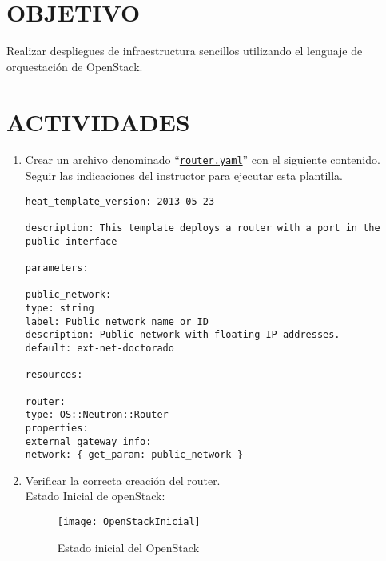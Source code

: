 \documentclass[10pt]{article}   			%
\begin{document}
\section{OBJETIVO}
Realizar despliegues de infraestructura sencillos utilizando el lenguaje de orquestación de OpenStack.
\section{ACTIVIDADES}	

\begin{enumerate}


	\item  Crear un archivo denominado “\texttt{\href{https://github.com/wilrilo/talleres/blob/master/file/taller1/router.yaml}{router.yaml}}” con el siguiente contenido. Seguir las indicaciones del instructor para ejecutar esta plantilla.

\begin{small}
	\begin{lstlisting}[frame=single,style=base]	
heat_template_version: 2013-05-23

description: This template deploys a router with a port in the public interface

parameters:

public_network:
type: string
label: Public network name or ID
description: Public network with floating IP addresses.
default: ext-net-doctorado

resources:

router:
type: OS::Neutron::Router
properties:
external_gateway_info:
network: { get_param: public_network }

	\end{lstlisting}
\end{small}

\item Verificar la correcta creación del router.\\


Estado Inicial de openStack:\\



\begin{figure}[ht] %
	\centering
	\texttt{[image: OpenStackInicial]}   %
	\caption{Estado inicial del OpenStack} \label{fig:Elementos}
\end{figure}



\end{enumerate}
\end{document}
